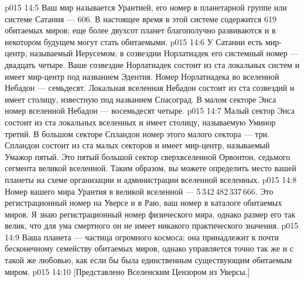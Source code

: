\vs p015 14:5 \pc Ваш мир называется Урантией, его номер в планетарной группе или системе Сатания --- 606. В настоящее время в этой системе содержится 619 обитаемых миров; еще более двухсот планет благополучно развиваются и в некотором будущем могут стать обитаемыми.
\vs p015 14:6 У Сатании есть мир\hyp{}центр, называемый Иерусемом; в созвездии Норлатиадек его системный номер --- двадцать четыре. Ваше созвездие Норлатиадек состоит из ста локальных систем и имеет мир\hyp{}центр под названием Эдентия. Номер Норлатиадека во вселенной Небадон --- семьдесят. Локальная вселенная Небадон состоит из ста созвездий и имеет столицу, известную под названием Спасоград. В малом секторе Энса номер вселенной Небадон --- восемьдесят четыре.
\vs p015 14:7 Малый сектор Энса состоит из ста локальных вселенных и имеет столицу, называемую Уминор третий. В большом секторе Спландон номер этого малого сектора --- три. Спландон состоит из ста малых секторов и имеет мир\hyp{}центр, называемый Умажор пятый. Это пятый большой сектор сверхвселенной Орвонтон, седьмого сегмента великой вселенной. Таким образом, вы можете определить место вашей планеты на схеме организации и администрации вселенной вселенных.
\vs p015 14:8 Номер вашего мира Урантия в великой вселенной --- 5\,342\,482\,337\,666. Это регистрационный номер на Уверсе и в Раю, ваш номер в каталоге обитаемых миров. Я знаю регистрационный номер физического мира, однако размер его так велик, что для ума смертного он не имеет никакого практического значения.
\vs p015 14:9 \pc Ваша планета --- частица огромного космоса; она принадлежит к почти бесконечному семейству обитаемых миров, однако управляется точно так же и с такой же любовью, как если бы была единственным существующим обитаемым миром.
\vsetoff
\vs p015 14:10 [Представлено Вселенским Цензором из Уверсы.]
